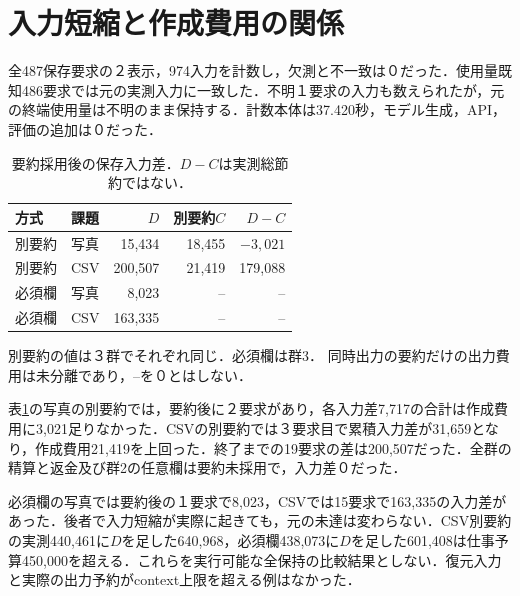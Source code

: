 \section{入力短縮と作成費用の関係}
全487保存要求の２表示，974入力を計数し，欠測と不一致は０だった．使用量既知486要求では元の実測入力に一致した．不明１要求の入力も数えられたが，元の終端使用量は不明のまま保持する．計数本体は37.420秒，モデル生成，API，評価の追加は０だった．

\begin{table}[t]
\centering\small
\caption{要約採用後の保存入力差．$D-C$は実測総節約ではない．}
\label{tab:inputs}
\begin{tabular}{llrrr}
\hline
方式 & 課題 & $D$ & 別要約$C$ & $D-C$ \\
\hline
別要約 & 写真 & 15,434 & 18,455 & $-3,021$ \\
別要約 & CSV & 200,507 & 21,419 & 179,088 \\
必須欄 & 写真 & 8,023 & -- & -- \\
必須欄 & CSV & 163,335 & -- & -- \\
\hline
\end{tabular}
\par\smallskip\footnotesize 別要約の値は３群でそれぞれ同じ．必須欄は群3．
同時出力の要約だけの出力費用は未分離であり，--を０とはしない．
\end{table}

表\ref{tab:inputs}の写真の別要約では，要約後に２要求があり，各入力差7,717の合計は作成費用に3,021足りなかった．CSVの別要約では３要求目で累積入力差が31,659となり，作成費用21,419を上回った．終了までの19要求の差は200,507だった．全群の精算と返金及び群2の任意欄は要約未採用で，入力差０だった．

必須欄の写真では要約後の１要求で8,023，CSVでは15要求で163,335の入力差があった．後者で入力短縮が実際に起きても，元の未達は変わらない．CSV別要約の実測440,461に$D$を足した640,968，必須欄438,073に$D$を足した601,408は仕事予算450,000を超える．これらを実行可能な全保持の比較結果としない．復元入力と実際の出力予約がcontext上限を超える例はなかった．
